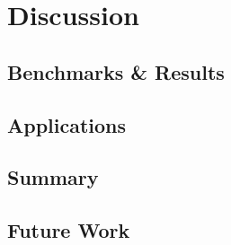 \chapter{Discussion}

\section{Benchmarks \& Results}

\section{Applications}

\section{Summary}

\section{Future Work}
